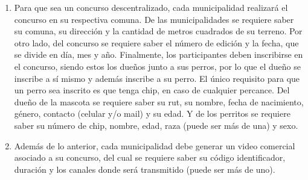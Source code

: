 \documentclass[letterpaper]{article}
\begin{document}
\begin{enumerate}
    \item Para que sea un concurso descentralizado, cada municipalidad realizará el concurso en su respectiva comuna. De las municipalidades se requiere saber su comuna, su dirección y la cantidad de metros cuadrados de su terreno. Por otro lado, del concurso se requiere saber el número de edición y la fecha, que se divide en día, mes y año. Finalmente, los participantes deben inscribirse en el concurso, siendo estos los dueños junto a sus perros, por lo que el dueño se inscribe a sí mismo y además inscribe a su perro. El único requisito para que un perro sea inscrito es que tenga chip, en caso de cualquier percance. Del dueño de la mascota se requiere saber su rut, su nombre, fecha de nacimiento, género, contacto (celular y/o mail) y su edad. Y de los perritos se requiere saber su número de chip, nombre, edad, raza (puede ser más de una) y sexo.
    \item Además de lo anterior, cada municipalidad debe generar un video comercial asociado a su concurso, del cual se requiere saber su código identificador, duración y los canales donde será transmitido (puede ser más de uno).
\end{enumerate}
\end{document}
